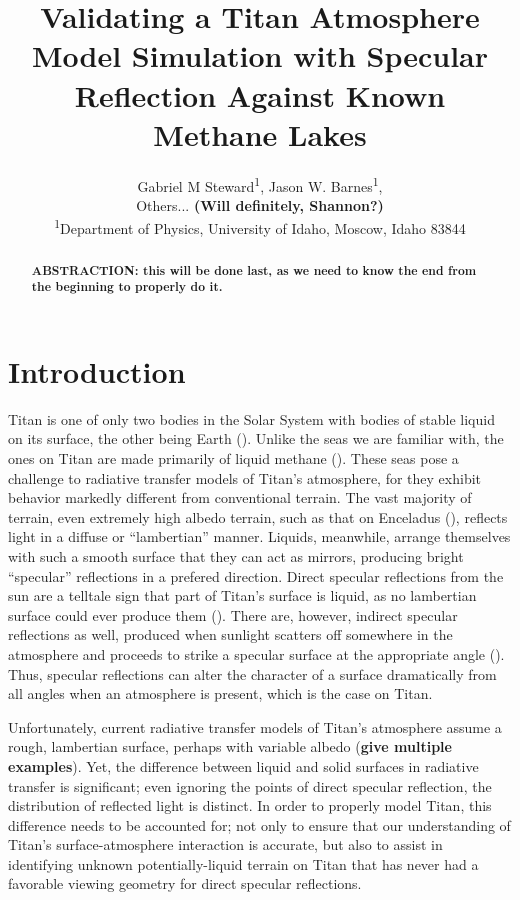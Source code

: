 \documentclass{article}
\title{\textbf{Validating a Titan Atmosphere Model Simulation with Specular Reflection Against Known Methane Lakes}}
\author{Gabriel M Steward\textsuperscript{1}, Jason W. Barnes\textsuperscript{1}, \\Others... \textbf{\color{red}(Will definitely, Shannon?)\color{black}}\\
		{\scriptsize \textsuperscript{1}Department of Physics, University of Idaho, Moscow, Idaho 83844}
}
\begin{document}
\pagestyle{fancy}
\fancyhead{}
\maketitle

\begin{abstract}
\textbf{\color{red}ABSTRACTION: this will be done last, as we need to know the end from the beginning to properly do it.\color{black}}
\end{abstract}

 
\section{Introduction}
Titan is one of only two bodies in the Solar System with bodies of stable liquid on its surface, the other being Earth (\cite{Hayes2016}). Unlike the seas we are familiar with, the ones on Titan are made primarily of liquid methane (\cite{Mastrogiuseppe2016}). These seas pose a challenge to radiative transfer models of Titan's atmosphere, for they exhibit behavior markedly different from conventional terrain. The vast majority of terrain, even extremely high albedo terrain, such as that on Enceladus (\cite{Li2023}), reflects light in a diffuse or ``lambertian'' manner. Liquids, meanwhile, arrange themselves with such a smooth surface that they can act as mirrors, producing bright ``specular'' reflections in a prefered direction. Direct specular reflections from the sun are a telltale sign that part of Titan's surface is liquid, as no lambertian surface could ever produce them (\cite{Stephan2010}). There are, however, indirect specular reflections as well, produced when sunlight scatters off somewhere in the atmosphere and proceeds to strike a specular surface at the appropriate angle (\cite{Vixie2015}). Thus, specular reflections can alter the character of a surface dramatically from all angles when an atmosphere is present, which is the case on Titan.

Unfortunately, current radiative transfer models of Titan's atmosphere assume a rough, lambertian surface, perhaps with variable albedo (\textbf{give multiple examples}). Yet, the difference between liquid and solid surfaces in radiative transfer is significant; even ignoring the points of direct specular reflection, the distribution of reflected light is distinct. In order to properly model Titan, this difference needs to be accounted for; not only to ensure that our understanding of Titan's surface-atmosphere interaction is accurate, but also to assist in identifying unknown potentially-liquid terrain on Titan that has never had a favorable viewing geometry for direct specular reflections. 
\end{document}
